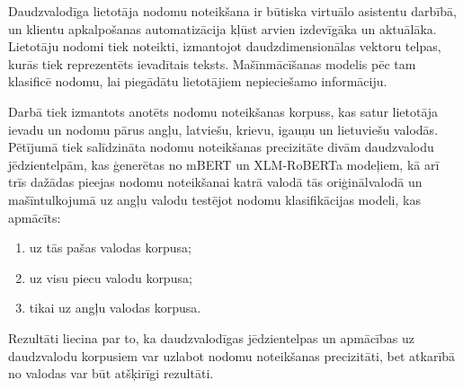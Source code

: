 Daudzvalodīga lietotāja nodomu noteikšana ir būtiska virtuālo asistentu darbībā, un klientu apkalpošanas automatizācija kļūst arvien izdevīgāka un aktuālāka. Lietotāju nodomi tiek noteikti, izmantojot daudzdimensionālas vektoru telpas, kurās tiek reprezentēts ievadītais teksts. Mašīnmācīšanas modelis pēc tam klasificē nodomu, lai piegādātu lietotājiem nepieciešamo informāciju.

Darbā tiek izmantots anotēts nodomu noteikšanas korpuss, kas satur lietotāja ievadu un nodomu pārus angļu, latviešu, krievu, igauņu un lietuviešu valodās. Pētījumā tiek salīdzināta nodomu noteikšanas precizitāte divām daudzvalodu jēdzientelpām, kas ģenerētas no mBERT un XLM-RoBERTa modeļiem, kā arī trīs dažādas pieejas nodomu noteikšanai katrā valodā tās oriģinālvalodā un mašīntulkojumā uz angļu valodu testējot nodomu klasifikācijas modeli, kas apmācīts:
\begin{enumerate}
    \item uz tās pašas valodas korpusa;
    \item uz visu piecu valodu korpusa;
    \item tikai uz angļu valodas korpusa.
\end{enumerate}

Rezultāti liecina par to, ka daudzvalodīgas jēdzientelpas un apmācības uz daudzvalodu korpusiem var uzlabot nodomu noteikšanas precizitāti, bet atkarībā no valodas var būt atšķirīgi rezultāti.

